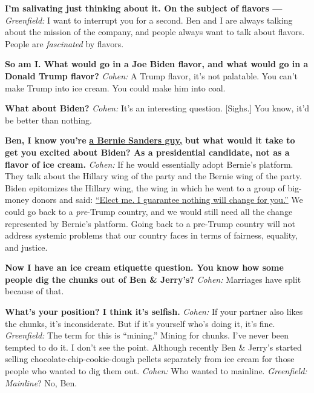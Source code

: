 \textbf{I'm salivating just thinking about it. On the subject of flavors
---} \emph{Greenfield:} I want to interrupt you for a second. Ben and I
are always talking about the mission of the company, and people always
want to talk about flavors. People are \emph{fascinated} by flavors.

\textbf{So am I. What would go in a Joe Biden flavor, and what would go
in a Donald Trump flavor?} \emph{Cohen:} A Trump flavor, it's not
palatable. You can't make Trump into ice cream. You could make him into
coal.

\textbf{What about Biden?} \emph{Cohen:} It's an interesting question.
{[}Sighs.{]} You know, it'd be better than nothing.

\textbf{Ben, I know you're}
\textbf{\href{http://nytimes3xbfgragh.onion\#tooltip-6}{a Bernie Sanders
guy,}} \textbf{but what would it take to get you excited about Biden? As
a presidential candidate, not as a flavor of ice cream.} \emph{Cohen:}
If he would essentially adopt Bernie's platform. They talk about the
Hillary wing of the party and the Bernie wing of the party. Biden
epitomizes the Hillary wing, the wing in which he went to a group of
big-money donors and said:
\href{http://nytimes3xbfgragh.onion\#tooltip-7}{``Elect me. I guarantee
nothing will change for you.''} We could go back to a \emph{pre}-Trump
country, and we would still need all the change represented by Bernie's
platform. Going back to a pre-Trump country will not address systemic
problems that our country faces in terms of fairness, equality, and
justice.

\textbf{Now I have an ice cream etiquette question. You know how some
people dig the chunks out of Ben \& Jerry's?} \emph{Cohen:} Marriages
have split because of that.

\textbf{What's your position? I think it's selfish.} \emph{Cohen:} If
your partner also likes the chunks, it's inconsiderate. But if it's
yourself who's doing it, it's fine. \emph{Greenfield:} The term for this
is ``mining.'' Mining for chunks. I've never been tempted to do it. I
don't see the point. Although recently Ben \& Jerry's started selling
chocolate-chip-cookie-dough pellets separately from ice cream for those
people who wanted to dig them out. \emph{Cohen:} Who wanted to mainline.
\emph{Greenfield:} \emph{Mainline}? No, Ben.

